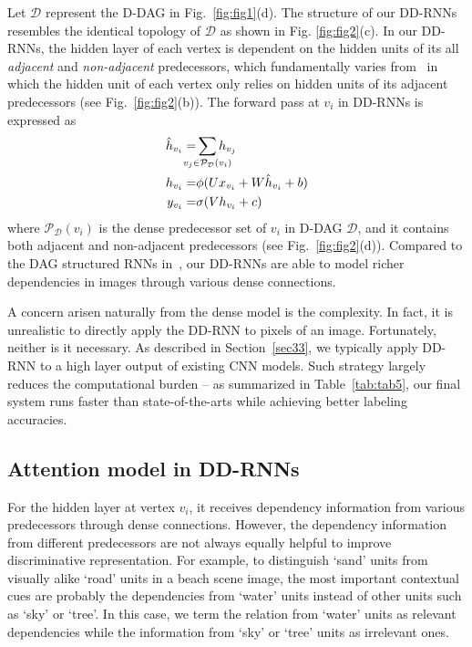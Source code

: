 \documentclass[10pt,twocolumn,letterpaper]{article}
\newcommand{\HL}[1]{\textcolor[rgb]{0.00,0.00,0.00}{#1}}
\begin{document}
Let $\mathcal{D}$ represent the D-DAG in Fig.~\ref{fig:fig1}(d). The structure of our DD-RNNs resembles the identical topology of $\mathcal{D}$ as shown in Fig. \ref{fig:fig2}(c). In our DD-RNNs, the hidden layer of each vertex is dependent on the hidden units of its all \emph{adjacent} and \emph{non-adjacent} predecessors, which fundamentally varies from~\cite{shuai2017scene} in which the hidden unit of each vertex only relies on hidden units of its adjacent predecessors (see Fig.~\ref{fig:fig2}(b)). The forward pass at $v_i$ in DD-RNNs is expressed as
\begin{align}
\hat{h}_{v_i} = &\sum\limits_{\mathclap{v_j\in{\mathcal{P}_{\mathcal{D}}(v_i)}}}{h_{v_j}} \label{eq33}\\
h_{v_i} = &\phi(Ux_{v_i}+W\hat{h}_{v_i}+b) \label{eq44} \\
y_{v_i} = &\sigma(Vh_{v_i}+c) \label{eq55}
\end{align}
where $\mathcal{P}_{\mathcal{D}}(v_i)$ is the dense predecessor set of $v_i$ in D-DAG $\mathcal{D}$, and it contains both adjacent and non-adjacent predecessors (see Fig.~\ref{fig:fig2}(d)). Compared to the DAG structured RNNs in~\cite{shuai2017scene}, our DD-RNNs are able to model richer dependencies in images through various dense connections.

\HL{A concern arisen naturally from the dense model is the complexity. In fact, it is unrealistic to directly apply the DD-RNN to pixels of an image. Fortunately, neither is it necessary. As described in Section~\ref{sec33}, we typically apply DD-RNN to a high layer output of existing CNN models. Such strategy largely reduces the computational burden -- as summarized in Table~\ref{tab:tab5}, our final system runs faster than state-of-the-arts while achieving better labeling accuracies.}

\subsection{Attention model in DD-RNNs}
\label{sec32}

For the hidden layer at vertex $v_i$, it receives dependency information from various predecessors through dense connections. However, the dependency information from different predecessors are not always equally helpful to improve discriminative representation. For example, to distinguish `sand' units from visually alike `road' units in a beach scene image, the most important contextual cues are probably the dependencies from `water' units instead of other units such as `sky' or `tree'. In this case, we term the relation from `water' units as relevant dependencies while the information from `sky' or `tree' units as irrelevant ones.
\end{document}
